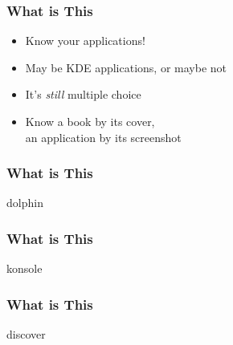 \begin{frame}
 \frametitle{What is This}

	\begin{itemize}
		\item Know your applications!
		\item May be KDE applications, or maybe not
		\item It's \emph{still} multiple choice
		\pause
	\item Know a book by its cover,\\\quad an application by its screenshot
	\end{itemize}
\end{frame}


\def\witq#1{
\begin{frame}
\frametitle{What is This}
#1
\end{frame}
}

\witq{dolphin}
\witq{konsole}
\witq{discover}
